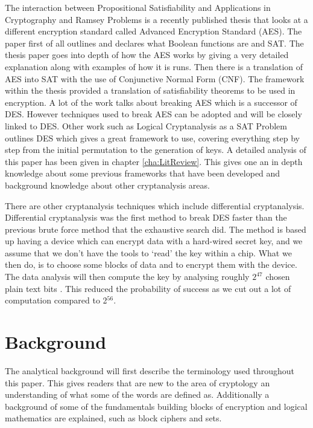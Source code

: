 \documentclass[11pt,a4paper]{report}
\begin{document}
The interaction between Propositional Satisfiability and Applications in Cryptography and Ramsey Problems \cite{Gwynne2010Interaction} is a recently published thesis that looks at a different encryption standard called Advanced Encryption Standard (AES). The paper first of all outlines and declares what Boolean functions are and SAT. The thesis paper goes into depth of how the AES works by giving a very detailed explanation along with examples of how it is runs. Then there is a translation of AES into SAT with the use of Conjunctive Normal Form (CNF). The framework within the thesis provided a translation of satisfiability theorems to be used in encryption. A lot of the work talks about breaking AES which is a successor of DES. However techniques used to break AES can be adopted and will be closely linked to DES.
Other work such as Logical Cryptanalysis as a SAT Problem \cite{Fabio2000LogicalSAT} outlines DES which gives a great framework to use, covering everything step by step from the initial permutation to the generation of keys. A detailed analysis of this paper has been given in chapter \ref{cha:LitReview}. This gives one an in depth knowledge about some previous frameworks that have been developed and background knowledge about other cryptanalysis areas.   

There are other cryptanalysis techniques which include differential cryptanalysis. Differential cryptanalysis was the first method to break DES faster than the previous brute force method that the exhaustive search did. The method is based up having a device which can encrypt data with a hard-wired secret key, and we assume that we don't have the tools to `read' the key within a chip. What we then do, is to choose some blocks of data and to encrypt them with the device. The data analysis will then compute the key by analysing roughly $2^{47}$ chosen plain text bits \cite{Junod2013LASEC}. This reduced  the probability of success as we cut out a lot of computation compared to 2$^{56}$.




\chapter{Background}
\label{cha:AnBack}

The analytical background will first describe the terminology used throughout this paper. This gives readers that are new to the area of cryptology an understanding of what some of the words are defined as. Additionally a background of some of the fundamentals building blocks of encryption and logical mathematics are explained, such as block ciphers and sets. 
\end{document}

